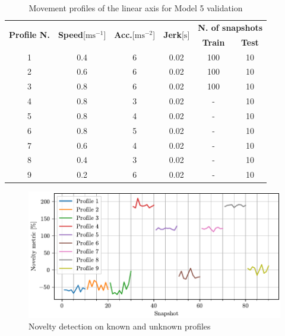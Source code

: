 \begin{table}
    \centering
    \caption{Movement profiles of the linear axis for Model 5 validation}
    \label{tab:etel_profiles_2}
    \begin{tabular}{cccccc} 
    \toprule
    \multirow{2}{*}{\textbf{Profile N.}} & \multirow{2}{*}{\textbf{Speed}{[}$\text{m}\text{s}^{-1}$]} & \multirow{2}{*}{\textbf{ Acc.}{[}$\text{m}\text{s}^{-2}$]} & \multirow{2}{*}{\textbf{Jerk}{[}$\text{s}$]} & \multicolumn{2}{c}{\textbf{N. of snapshots}} \\
     &  &  &  & \textbf{Train} & \textbf{Test} \\ 
    \hline
    1 & 0.4 & 6 & 0.02 & 100 & 10 \\
    2 & 0.6 & 6 & 0.02 & 100 & 10 \\
    3 & 0.8 & 6 & 0.02 & 100 & 10 \\
    4 & 0.8 & 3 & 0.02 & - & 10 \\
    5 & 0.8 & 4 & 0.02 & - & 10 \\
    6 & 0.8 & 5 & 0.02 & - & 10 \\
    7 & 0.6 & 4 & 0.02 & - & 10 \\
    8 & 0.4 & 3 & 0.02 & - & 10 \\
    9 & 0.2 & 6 & 0.02 & - & 10 \\
    \bottomrule
    \end{tabular}
    \end{table}

\begin{figure}
    \centering
    \includegraphics[width=\textwidth]{images/LinearMotor/Testing3.pdf}
    \caption{Novelty detection on known and unknown profiles}
    \label{fig:axis_testing3}
\end{figure}